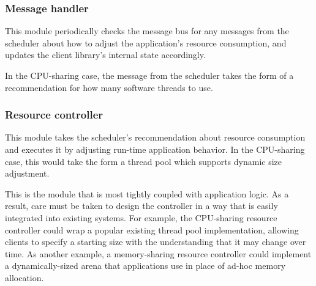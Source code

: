 \subsubsection{Message handler} 
This module periodically checks the message bus for any messages from the scheduler about how to adjust the application's resource consumption, and updates the client library's internal state accordingly. 

In the CPU-sharing case, the message from the scheduler takes the form of a recommendation for how many software threads to use.

\subsubsection{Resource controller}
This module takes the scheduler's recommendation about resource consumption and executes it by adjusting run-time application behavior. In the CPU-sharing case, this would take the form a thread pool which supports dynamic size adjustment. 

This is the module that is most tightly coupled with application logic. As a result, care must be taken to design the controller in a way that is easily integrated into existing systems. For example, the CPU-sharing resource controller could wrap a popular existing thread pool implementation, allowing clients to specify a starting size with the understanding that it may change over time. As another example, a memory-sharing resource controller could implement a dynamically-sized arena that applications use in place of ad-hoc memory allocation.
